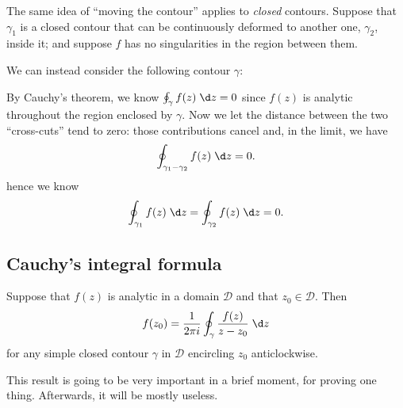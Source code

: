 \documentclass[a4paper]{article}
\begin{document}
The same idea of ``moving the contour'' applies to \emph{closed} contours. Suppose that $\gamma_1$ is a closed contour that can be continuously deformed to another one, $\gamma_2$, inside it; and suppose $f$ has no singularities in the region between them.
\begin{center}
\end{center}
We can instead consider the following contour $\gamma$:
\begin{center}
\end{center}
By Cauchy's theorem, we know $\oint_\gamma f(z)\;\d z = 0$ since $f(z)$ is analytic throughout the region enclosed by $\gamma$. Now we let the distance between the two ``cross-cuts'' tend to zero: those contributions cancel and, in the limit, we have
\[
  \oint_{\gamma_1 - \gamma_2} f(z)\;\d z = 0.
\]
hence we know
\[
  \oint_{\gamma_1} f(z)\;\d z = \oint_{\gamma_2} f(z)\;\d z = 0.
\]

\subsection{Cauchy's integral formula}
\begin{thm}
  Suppose that $f(z)$ is analytic in a domain $\mathcal{D}$ and that $z_0 \in \mathcal{D}$. Then
  \[
    f(z_0) = \frac{1}{2\pi i} \oint_\gamma \frac{f(z)}{z - z_0}\;\d z
  \]
  for any simple closed contour $\gamma$ in $\mathcal{D}$ encircling $z_0$ anticlockwise.
\end{thm}
This result is going to be very important in a brief moment, for proving one thing. Afterwards, it will be mostly useless.
\end{document}
